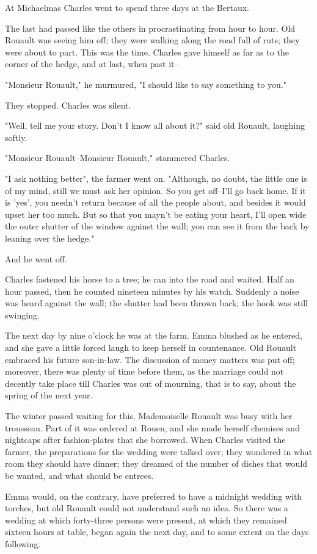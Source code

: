\documentclass[11pt,twocolumn]{ltugboat}
\begin{document}
At Michaelmas Charles went to spend three days at the Bertaux.

The last had passed like the others in procrastinating from hour to
hour. Old Rouault was seeing him off; they were walking along the road
full of ruts; they were about to part. This was the time. Charles gave
himself as far as to the corner of the hedge, and at last, when past
it--

"Monsieur Rouault," he murmured, "I should like to say something to
you."

They stopped. Charles was silent.

"Well, tell me your story. Don't I know all about it?" said old Rouault,
laughing softly.

"Monsieur Rouault--Monsieur Rouault," stammered Charles.

"I ask nothing better", the farmer went on. "Although, no doubt, the
little one is of my mind, still we must ask her opinion. So you get
off--I'll go back home. If it is 'yes', you needn't return because of
all the people about, and besides it would upset her too much. But so
that you mayn't be eating your heart, I'll open wide the outer shutter
of the window against the wall; you can see it from the back by leaning
over the hedge."

And he went off.

Charles fastened his horse to a tree; he ran into the road and waited.
Half an hour passed, then he counted nineteen minutes by his watch.
Suddenly a noise was heard against the wall; the shutter had been thrown
back; the hook was still swinging.

The next day by nine o'clock he was at the farm. Emma blushed as
he entered, and she gave a little forced laugh to keep herself in
countenance. Old Rouault embraced his future son-in-law. The discussion
of money matters was put off; moreover, there was plenty of time before
them, as the marriage could not decently take place till Charles was out
of mourning, that is to say, about the spring of the next year.

The winter passed waiting for this. Mademoiselle Rouault was busy with
her trousseau. Part of it was ordered at Rouen, and she made herself
chemises and nightcaps after fashion-plates that she borrowed. When
Charles visited the farmer, the preparations for the wedding were talked
over; they wondered in what room they should have dinner; they dreamed
of the number of dishes that would be wanted, and what should be
entrees.

Emma would, on the contrary, have preferred to have a midnight wedding
with torches, but old Rouault could not understand such an idea. So
there was a wedding at which forty-three persons were present, at which
they remained sixteen hours at table, began again the next day, and to
some extent on the days following.
\end{document}
